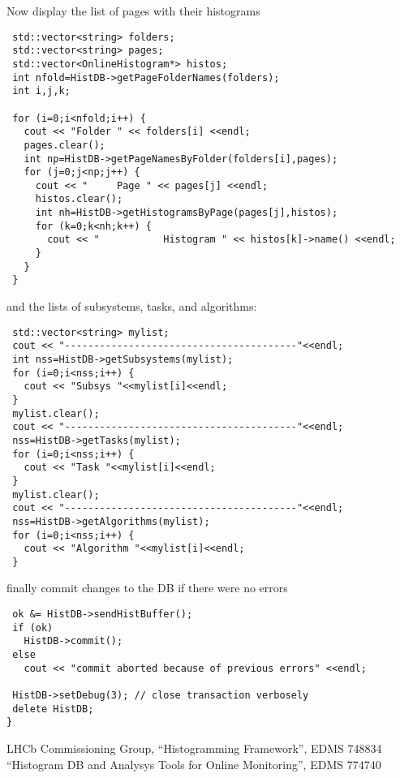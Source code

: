 \documentclass{lhcbnote}
\begin{document}
Now display the list of pages with their histograms
\begin{verbatim}
 std::vector<string> folders;
 std::vector<string> pages;
 std::vector<OnlineHistogram*> histos; 
 int nfold=HistDB->getPageFolderNames(folders);
 int i,j,k;

 for (i=0;i<nfold;i++) {
   cout << "Folder " << folders[i] <<endl;
   pages.clear();
   int np=HistDB->getPageNamesByFolder(folders[i],pages);
   for (j=0;j<np;j++) {
     cout << "     Page " << pages[j] <<endl;
     histos.clear();
     int nh=HistDB->getHistogramsByPage(pages[j],histos);
     for (k=0;k<nh;k++) {
       cout << "           Histogram " << histos[k]->name() <<endl;
     }    
   }
 }
\end{verbatim}
and the lists of subsystems, tasks, and algorithms:
\begin{verbatim}
 std::vector<string> mylist;
 cout << "----------------------------------------"<<endl;
 int nss=HistDB->getSubsystems(mylist);
 for (i=0;i<nss;i++) {
   cout << "Subsys "<<mylist[i]<<endl;
 }
 mylist.clear();
 cout << "----------------------------------------"<<endl;
 nss=HistDB->getTasks(mylist);
 for (i=0;i<nss;i++) {
   cout << "Task "<<mylist[i]<<endl;
 }
 mylist.clear();
 cout << "----------------------------------------"<<endl;
 nss=HistDB->getAlgorithms(mylist);
 for (i=0;i<nss;i++) {
   cout << "Algorithm "<<mylist[i]<<endl;
 }
\end{verbatim}

finally commit changes to the DB if there were no errors
\begin{verbatim}
 ok &= HistDB->sendHistBuffer();
 if (ok) 
   HistDB->commit();
 else 
   cout << "commit aborted because of previous errors" <<endl;

 HistDB->setDebug(3); // close transaction verbosely
 delete HistDB;
}
\end{verbatim}


\begin{thebibliography}{99}
LHCb Commissioning Group, ``Histogramming Framework'', EDMS 748834
``Histogram DB and Analysys Tools for Online Monitoring'', EDMS 774740

\end{thebibliography}
\end{document}
